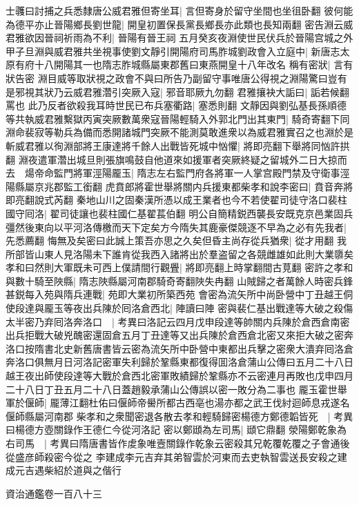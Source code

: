 士彠曰討捕之兵悉隸唐公威君雅但寄坐耳|{
	言但寄身於留守坐間也坐徂卧翻}
彼何能為德平亦止晉陽鄉長劉世龍|{
	開皇初置保長黨長鄉長亦此類也長知兩翻}
密告淵云威君雅欲因晉祠祈雨為不利|{
	晉陽有晉王祠}
五月癸亥夜淵使世民伏兵於晉陽宫城之外甲子旦淵與威君雅共坐視事使劉文靜引開陽府司馬胙城劉政會入立庭中|{
	新唐志太原有府十八開陽其一也隋志胙城縣屬東郡舊曰東燕開皇十八年改名}
稱有密狀|{
	言有狀告密}
淵目威等取狀視之政會不與曰所告乃副留守事唯唐公得視之淵陽驚曰豈有是邪視其狀乃云威君雅濳引突厥入寇|{
	邪音耶厥九勿翻}
君雅攘袂大詬曰|{
	詬若候翻罵也}
此乃反者欲殺我耳時世民已布兵塞衢路|{
	塞悉則翻}
文靜因與劉弘基長孫順德等共執威君雅繫獄丙寅突厥數萬衆寇晉陽輕騎入外郭北門出其東門|{
	騎奇寄翻下同}
淵命裴寂等勒兵為備而悉開諸城門突厥不能測莫敢進衆以為威君雅實召之也淵於是斬威君雅以徇淵部將王康達將千餘人出戰皆死城中忷懼|{
	將即亮翻下舉將同忷許拱翻}
淵夜遣軍濳出城旦則張旗鳴鼓自他道來如援軍者突厥終疑之留城外二日大掠而去　煬帝命監門將軍涇陽龎玉|{
	隋志左右監門府各將軍一人掌宫殿門禁及守衛事涇陽縣屬京兆郡監工銜翻}
虎賁郎將霍世舉將關内兵援東都柴孝和說李密曰|{
	賁音奔將即亮翻說式芮翻}
秦地山川之固秦漢所憑以成王業者也今不若使翟司徒守洛口裴柱國守囘洛|{
	翟司徒讓也裴柱國仁基翟萇伯翻}
明公自簡精鋭西襲長安既克京邑業固兵彊然後東向以平河洛傳檄而天下定矣方今隋失其鹿豪傑競逐不早為之必有先我者|{
	先悉薦翻}
悔無及矣密曰此誠上策吾亦思之久矣但昏主尚存從兵猶衆|{
	從才用翻}
我所部皆山東人見洛陽未下誰肯從我西入諸將出於羣盗留之各競雌雄如此則大業隳矣孝和曰然則大軍既未可西上僕請間行觀舋|{
	將即亮翻上時掌翻間古莧翻}
密許之孝和與數十騎至陜縣|{
	隋志陜縣屬河南郡騎奇寄翻陜失冉翻}
山賊歸之者萬餘人時密兵鋒甚鋭每入苑與隋兵連戰|{
	苑即大業初所築西苑}
會密為流矢所中尚卧營中丁丑越王侗使段達與龎玉等夜出兵陳於囘洛倉西北|{
	陣讀曰陣}
密與裴仁基出戰達等大破之殺傷太半密乃弃囘洛奔洛口　|{
	考異曰洛記云四月戊申段達等帥關内兵陳於倉西倉南密出兵拒戰大破兇醜密還固倉五月丁丑達等又出兵陳於倉西倉北密又來拒大破之密奔洛口按隋書北史新舊唐書皆云密為流矢所中卧營中東都出兵擊之密衆大潰弃囘洛倉奔洛口俱無月日河洛記密軍失利歸於鞏縣東都復得囬洛倉蒲山公傳曰五月二十八日越王夜出師使段達等大戰於倉西北密軍敗績歸於鞏縣亦不云密連月再敗也戊申四月二十八日丁丑五月二十八日蓋趙毅承蒲山公傳誤以密一敗分為二事也}
龎玉霍世舉軍於偃師|{
	龎薄江翻杜佑曰偃師帝嚳所都古西亳也湯亦都之武王伐紂迴師息戎遂名偃師縣屬河南郡}
柴孝和之衆聞密退各散去孝和輕騎歸密楊德方鄭德韜皆死　|{
	考異曰楊德方壺關錄作王德仁今從河洛記}
密以鄭頲為左司馬|{
	頲它鼎翻}
滎陽鄭乾象為右司馬　|{
	考異曰隋唐書皆作䖍象唯壼關錄作乾象云密殺其兄乾覆乾覆之子會通後從盛彦師殺密今從之}
李建成李元吉弃其弟智雲於河東而去吏執智雲送長安殺之建成元吉遇柴紹於道與之偕行

資治通鑑卷一百八十三

